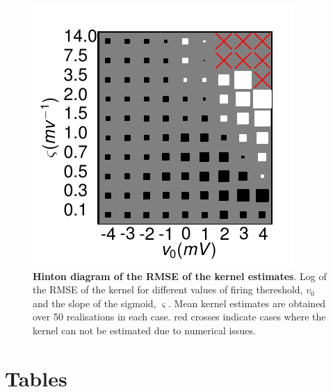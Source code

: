 \documentclass[12pt]{iopart}
\begin{document}
\begin{figure}[!ht]
\begin{center}
\includegraphics{./Graph/pdf/Figure12.pdf}
\end{center}
\caption{{\bf Hinton diagram of the RMSE of the kernel estimates}. Log of the RMSE of the kernel for different values of firing thereshold, $v_0$ and the slope of the sigmoid, $\varsigma$. Mean kernel estimates are obtained over 50 realisations in each case. red crosses indicate cases where the kernel can not be estimated due to numerical issues.}
\label{fig:Figure12}
\end{figure}

\section*{Tables}
\end{document}
